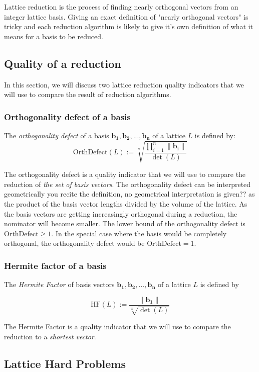 \documentclass[10pt, a4paper]{article}
\newcommand{\my}[1]{{\color{blue} #1 }}
\renewcommand{\vec}[1]{\mathbf{#1}}
\begin{document}
Lattice reduction is the process of finding nearly orthogonal vectors from an integer lattice basis. Giving an exact definition of "nearly orthogonal vectors" is tricky and each reduction algorithm is likely to give it's own definition of what it means for a basis to be reduced.

\subsection{Quality of a reduction}

In this section, we will discuss two lattice reduction quality indicators that we will use to compare the result of reduction algorithms.

\subsubsection{Orthogonality defect of a basis}
\label{sec:orthogonalityDefect}
The \emph{orthogonality defect} of a basis $\vec{b_1},\vec{b_2},...,\vec{b_n}$ of a lattice $L$ is defined by:
\[
    \text{OrthDefect}(L) :=  \sqrt[n]{\frac{\displaystyle\prod^{n}_{i=1} \|\vec{b_i}\| }{\det(L)}}
\]

The orthogonality defect is a quality indicator that we will use to compare the reduction of \emph{the set of basis vectors}. The orthogonality defect can be interpreted geometrically \my{you recite the definition, no geometrical interpretation is given??} as the product of the basis vector lengths divided by the volume of the lattice. As the basis vectors are getting increasingly orthogonal during a reduction, the nominator will become smaller. The lower bound of the orthogonality defect is $\text{OrthDefect} \ge 1$. In the special case where the basis would be completely orthogonal, the orthogonality defect would be $\text{OrthDefect} = 1$.

\subsubsection{Hermite factor of a basis}
\label{sec:hermiteFactor}
The \emph{Hermite Factor} of basis vectors $\vec{b_1}, \vec{b_2},...,\vec{b_n}$ of a lattice $L$ is defined by

\[
    \text{HF}(L) := \frac{\|\vec{b_1}\|}{\sqrt[n]{\det(L)}}
\]

The Hermite Factor is a quality indicator that we will use to compare the reduction to a \emph{shortest vector}.

\subsection{Lattice Hard Problems}
\end{document}
